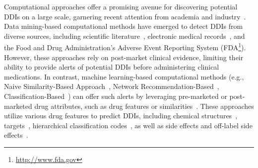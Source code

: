 \documentclass[unnumsec,webpdf,contemporary,large]{oup-authoring-template}%
\theoremstyle{thmstyleone}%
\theoremstyle{thmstyletwo}%
\theoremstyle{thmstylethree}%
\begin{document}
Computational approaches offer a promising avenue for discovering potential DDIs on a large scale, garnering recent attention from academia and industry~\cite{Barbara2016, Zhou2016}. Data mining-based computational methods have emerged to detect DDIs from diverse sources, including scientific literature~\cite{Bui2014, Zhang2016le}, electronic medical records~\cite{Yamanishi2008}, and the Food and Drug Administration's Adverse Event Reporting System (FDA\footnote{\url{http://www.fda.gov}}). However, these approaches rely on post-market clinical evidence, limiting their ability to provide alerts of potential DDIs before administering clinical medications. In contrast, machine learning-based computational methods (e.g., Naive Similarity-Based Approach~\cite{Vilar2014}, Network Recommendation-Based~\cite{Zhang2015, Karim2019}, Classification-Based~\cite{Cheng2014}) can offer such alerts by leveraging pre-marketed or post-marketed drug attributes, such as drug features or similarities~\cite{Pahikkala2015}. These approaches utilize various drug features to predict DDIs, including chemical structures~\cite{Vilar2014}, targets~\cite{Luo2014}, hierarchical classification codes~\cite{Cheng2014}, as well as side effects and off-label side effects~\cite{Zhang2015, Karim2019, ShiHLLZY17}.
\end{document}
